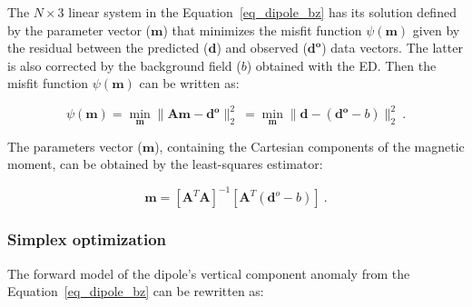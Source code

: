 
    The $N \times 3$ linear system in the Equation~\ref{eq_dipole_bz} has its solution defined by the parameter vector ($\mathbf{m}$) that minimizes the misfit function $\psi(\mathbf{m})$ given by the residual between the predicted ($\mathbf{\mathbf{d}}$) and observed ($\mathbf{\mathbf{d}^o}$) data vectors. The latter is also  corrected by the background field ($b$) obtained with the ED. Then the misfit function $\psi(\mathbf{m})$ can be written as:
   
    \begin{equation}
    \label{psi_function}
    \psi(\mathbf{m}) = \min_{\mathbf{m}} \| \mathbf{A}\mathbf{m} - \mathbf{\mathbf{d}^o} \|_2^2\ = \min_{\mathbf{m}} \| \mathbf{d} - (\mathbf{\mathbf{d}^o}-b) \|_2^2\
    .
    \end{equation}

    The parameters vector ($\mathbf{m}$), containing the Cartesian components of the magnetic moment, can be obtained by the least-squares estimator:

    \begin{equation}
    \label{dipole_moment_solution}
    \mathbf{m} = {[\mathbf{A}^T \mathbf{A}]}^{-1} [\mathbf{A}^T (\mathbf{d}^o - b)]\ .
    \end{equation}
        
\subsubsection{Simplex optimization} 
     The forward model of the dipole's vertical component anomaly from the Equation~\ref{eq_dipole_bz} can be rewritten as:

